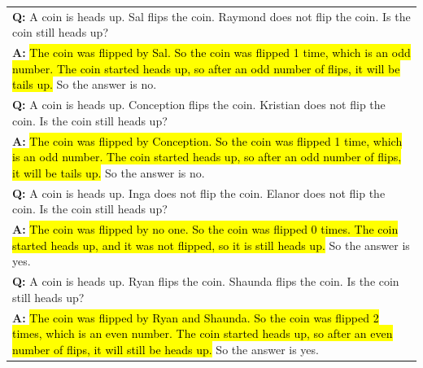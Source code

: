 \documentclass[]{article}
\theoremstyle{plain}
\theoremstyle{definition}
\theoremstyle{remark}
\begin{document}
\begin{table}[H]
\begin{tabular}{p{\linewidth}}
        \vspace{0mm}
        \textbf{Q:} A coin is heads up. Sal flips the coin. Raymond does not flip the coin. Is the coin still heads up? \\
        \vspace{-1mm}
        \textbf{A:} \hl{The coin was flipped by Sal. So the coin was flipped 1 time, which is an odd number. The coin started heads up, so after an odd number of flips, it will be tails up.} So the answer is no. \\
        \vspace{0mm}
        \textbf{Q:} A coin is heads up. Conception flips the coin. Kristian does not flip the coin. Is the coin still heads up? \\
        \vspace{-1mm}
        \textbf{A:} \hl{The coin was flipped by Conception. So the coin was flipped 1 time, which is an odd number. The coin started heads up, so after an odd number of flips, it will be tails up.} So the answer is no. \\
        \vspace{0mm}
        \textbf{Q:} A coin is heads up. Inga does not flip the coin. Elanor does not flip the coin. Is the coin still heads up? \\
        \vspace{-1mm}
        \textbf{A:} \hl{The coin was flipped by no one. So the coin was flipped 0 times. The coin started heads up, and it was not flipped, so it is still heads up.} So the answer is yes. \\
        \vspace{0mm}
        \textbf{Q:} A coin is heads up. Ryan flips the coin. Shaunda flips the coin. Is the coin still heads up? \\
        \vspace{-1mm}
        \textbf{A:} \hl{The coin was flipped by Ryan and Shaunda. So the coin was flipped 2 times, which is an even number. The coin started heads up, so after an even number of flips, it will still be heads up.} So the answer is yes. \\
        \bottomrule
    \end{tabular}
    \label{tab:appendix-coinflip-prompt}
\end{table}
\endgroup
\begingroup
\end{document}
